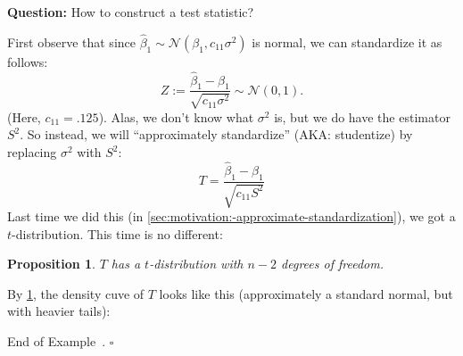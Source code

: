 \documentclass[10pt]{article}
\newtheorem{proposition}[theorem]{Proposition}
\theoremstyle{definition}
\newtheorem{example}[theorem]{Example}
\renewenvironment{example}
{\begin{oldexample}}
  {\par\smallskip\hfill   End of Example~\theexample. $\square$    \par\end{oldexample}}
\newcommand{\vt}{\vskip 5mm} %
\newcommand{\Fl}{\vt\noindent\textbf} %
\newcommand{\1}[1]{\textbf{1}_{\left[#1\right]}} %
\begin{document}
\begin{example}
  \Fl{Question:} How to construct a test statistic?

  First observe that since
  $\widehat{\beta}_{1}\sim \mathcal{N}(\beta_{1},c_{11}\sigma^{2})$ is normal,
  we can standardize it as follows:
  \begin{equation}\label{eq:standardize-LSE}
    Z := \frac{\widehat{\beta}_{1} -\beta_{1}}{\sqrt{c_{11}\sigma^{2}}} \sim \mathcal{N}(0,1).
  \end{equation}
  (Here, $c_{11}=.125$). Alas, we don't know what $\sigma^{2}$ is, but we do
  have the estimator $S^{2}$. So instead, we will ``approximately
  standardize'' (AKA: studentize) by
  replacing $\sigma^{2}$ with $S^{2}$:
  \begin{equation*}
    T = \frac{\widehat{\beta}_{1}-\beta_{1}}{\sqrt{c_{11}S^{2}}}
  \end{equation*}
  Last time we did this (in
  \cref{sec:motivation:-approximate-standardization}), we got a
  $t$-distribution. This time is no different:

  \begin{proposition}
    \label{prop:t-distribution}
    $T$ has a $t$-distribution with $n-2$ degrees of freedom.
  \end{proposition}

  By \cref{prop:t-distribution}, the density cuve of $T$ looks like this
  (approximately a standard normal, but with heavier tails):
  \begin{center}
  \end{center}


\end{example}
\end{document}
